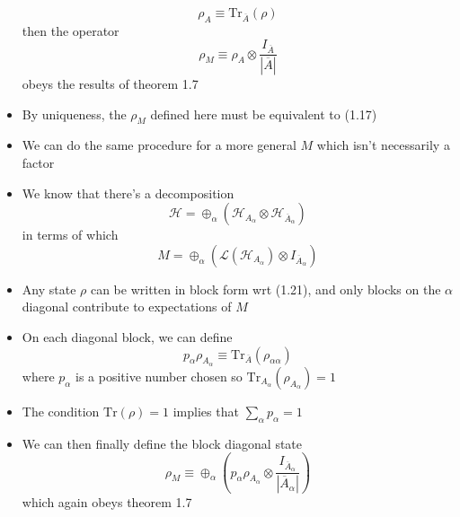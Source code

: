 \documentclass[12pt,a4paper]{article}
\numberwithin{equation}{section}
\theoremstyle{definition}
\theoremstyle{theorem}
\begin{document}
\begin{itemize}
		\begin{equation}
			\rho_{A}\equiv \text{Tr}_{\overline{A}}(\rho)
		\end{equation}
		then the operator
		\begin{equation}
			\rho_{M}\equiv \rho_{A}\otimes\frac{I_{\overline{A}}}{|\overline{A}|}
		\end{equation}
		obeys the results of theorem 1.7
		\item By uniqueness, the $\rho_{M}$ defined here must be equivalent to (1.17)
		\item We can do the same procedure for a more general $M$ which isn't necessarily a factor
		\item We know that there's a decomposition 
		\begin{equation}
			\mathcal{H}=\oplus_{\alpha}\left(\mathcal{H}_{A_{\alpha}}\otimes\mathcal{H}_{\overline{A}_{\alpha}}\right)
		\end{equation}
		in terms of which 
		\begin{equation}
			M=\oplus_{\alpha}\left(\mathcal{L}\left(\mathcal{H}_{A_{\alpha}}\right)\otimes I_{\overline{A}_{\alpha}}\right)
		\end{equation}
		\item Any state $\rho$ can be written in block form wrt (1.21), and only blocks on the $\alpha$ diagonal contribute to expectations of $M$
		\item On each diagonal block, we can define
		\begin{equation}
			p_{\alpha}\rho_{A_{\alpha}}\equiv \text{Tr}_{\overline{A}}(\rho_{\alpha\alpha})
		\end{equation}
		where $p_{\alpha}$ is a positive number chosen so $\text{Tr}_{A_{\alpha}}(\rho_{A_{\alpha}})=1$
		\item The condition $\text{Tr}(\rho)=1$ implies that $\sum_{\alpha}p_{\alpha}=1$
		\item We can then finally define the block diagonal state
		\begin{equation}
			\rho_{M}\equiv\oplus_{\alpha}\left(p_{\alpha}\rho_{A_{\alpha}}\otimes\frac{I_{\overline{A}_{\alpha}}}{|\overline{A}_{\alpha}|}\right)
		\end{equation}
		which again obeys theorem 1.7
	\end{itemize}
\end{document}
